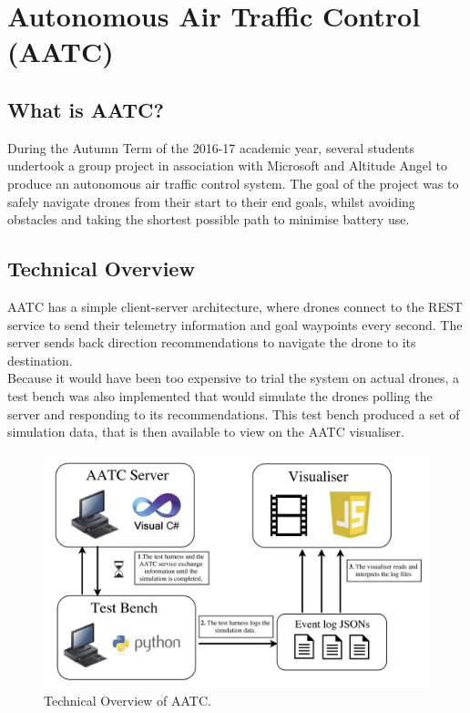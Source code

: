 \documentclass[a4paper,11pt,titlepage]{report}
\begin{document}
\section{Autonomous Air Traffic Control (AATC)}
\subsection{What is AATC?}
During the Autumn Term of the 2016-17 academic year, several students undertook a group project in association with Microsoft and Altitude Angel to produce an autonomous air traffic control system. The goal of the project was to safely navigate drones from their start to their end goals, whilst avoiding obstacles and taking the shortest possible path to minimise battery use.

\clearpage
\subsection{Technical Overview}
AATC has a simple client-server architecture, where drones connect to the REST service to send their telemetry information and goal waypoints every second. The server sends back direction recommendations to navigate the drone to its destination. \\

Because it would have been too expensive to trial the system on actual drones, a test bench was also implemented that would simulate the drones polling the server and responding to its recommendations. This test bench produced a set of simulation data, that is then available to view on the AATC visualiser. \cite{Balaji2017a}

\begin{figure}[!hbpt]
  \center
  \includegraphics[width=\linewidth]{img/aatc_tech_overview.jpg}
  \caption{Technical Overview of AATC. \cite{Balaji2017}}
  \label{fig:aatc_tech_overview}
\end{figure}
\end{document}
